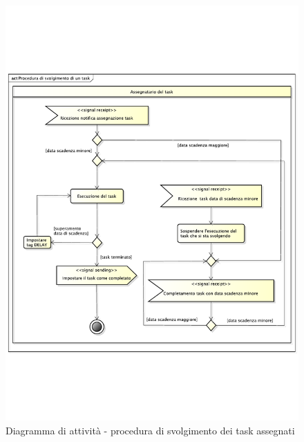 				\begin{figure}[htbp]
					\centering
					\includegraphics[width=14cm]{images/proc_svolgimento_task.pdf}
					\caption{Diagramma di attività - procedura di svolgimento dei task assegnati}
					\label{fig:procedura_svolgimento_task}				
				\end{figure}
				
